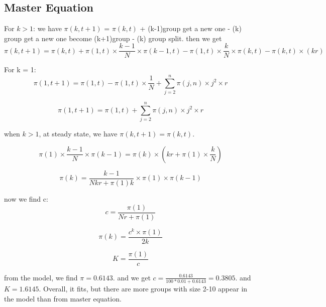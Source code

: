 \documentclass[12pt]{article}
\begin{document}
\newpage
\subsection{Master Equation}

For $k > 1$: we have $\pi(k, t+1)$ = $\pi(k, t)$ + (k-1)group get a new one - (k) group get a new one become (k+1)group - (k) group split. 
then we get 
\begin{equation}
	\pi (k, t+1) = \pi (k,t) + \pi(1,t) \times \frac{k-1}{N} \times \pi(k-1, t) - \pi(1,t) \times \frac{k}{N} \times \pi (k,t) - \pi(k,t) \times (kr)
\end{equation}

For k = 1:
\begin{equation}
	\pi (1, t+1) = \pi (1,t) -  \pi(1,t) \times \frac{1}{N} + \sum_{j =2}^{n}\pi (j, n) \times j^{2} \times r
\end{equation}

\begin{equation}
	\pi (1, t+1) = \pi (1,t) + \sum_{j =2}^{n}\pi (j, n) \times j^{2} \times r
\end{equation}

when $k>1$, at steady state, we have $\pi(k,t+1) = \pi(k,t)$.

\begin{equation}
	\pi (1) \times \frac{k-1}{N} \times \pi (k-1) = \pi (k) \times (kr + \pi (1) \times \frac{k}{N})
\end{equation}

\begin{equation}
	\pi (k) = \frac{k-1}{Nkr + \pi(1)k} \times \pi (1)  \times \pi (k-1)
\end{equation}

now we find c:
\begin{equation}
	c = \frac{\pi(1)}{Nr + \pi(1)} 
\end{equation}

\begin{equation}
	\pi(k) = \frac{c^{k} \times \pi(1)}{2k} 
\end{equation}

\begin{equation}
	K = \frac{\pi (1)}{c} 
\end{equation}

from the model, we find $\pi = 0.6143$. and we get $c = \frac{0.6143}{100*0.01 + 0.6143} = 0.3805$. and $K = 1.6145$. Overall, it fits, but there are more groups with size 2-10 appear in the model than from master equation.
\end{document}
